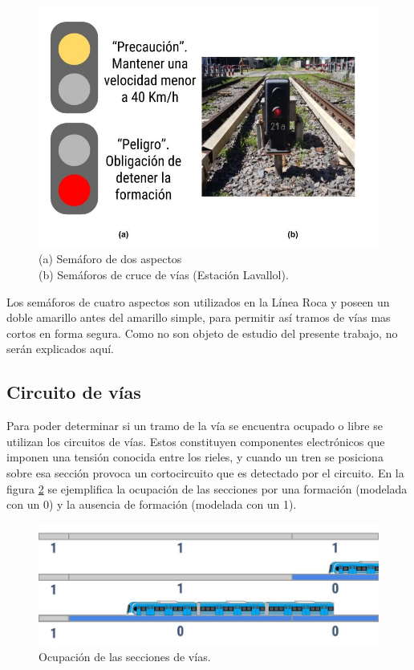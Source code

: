 			 \begin{figure}[htbp!]
				\centering
				\includegraphics[scale=.28]{./Figures/Sem2}
				\caption{(a) Semáforo de dos aspectos\\(b) Semáforos de cruce de vías (Estación Lavallol).}
				\label{fig:Sem_2Aspectos}
			\end{figure}				
			
			\vspace{10cm}
			
			Los semáforos de cuatro aspectos son utilizados en la Línea Roca y poseen un doble amarillo antes del amarillo simple, para permitir así tramos de vías mas cortos en forma segura. Como no son objeto de estudio del presente trabajo, no serán explicados aquí.
		
		\subsection{Circuito de vías}
		
			Para poder determinar si un tramo de la vía se encuentra ocupado o libre se utilizan los circuitos de vías. Estos constituyen componentes electrónicos que imponen una tensión conocida entre los rieles, y cuando un tren se posiciona sobre esa sección provoca un cortocircuito que es detectado por el circuito. En la figura \ref{fig:Ocupacion} se ejemplifica la ocupación de las secciones por una formación (modelada con un 0) y la ausencia de formación (modelada con un 1).
			
			\begin{figure}[h]
				\centering
				\includegraphics[scale=.4]{./Figures/Ocupacion}
				\caption{Ocupación de las secciones de vías.}
				\label{fig:Ocupacion}
			\end{figure}
			
